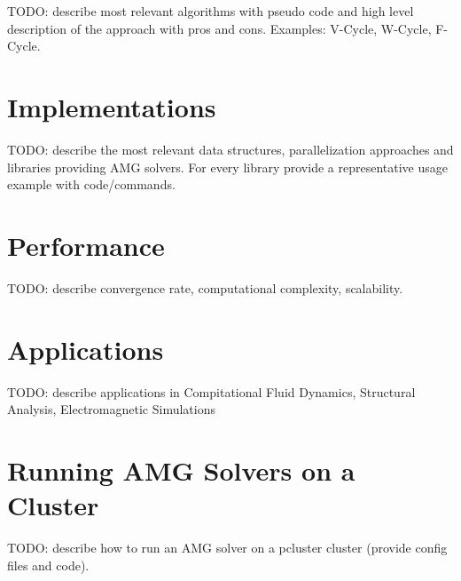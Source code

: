 TODO: describe most relevant algorithms with pseudo code and high level description of the approach with pros and cons. Examples: V-Cycle, W-Cycle, F-Cycle.

\section{Implementations}

TODO: describe the most relevant data structures, parallelization approaches and libraries providing AMG solvers. For every library provide a representative usage example with code/commands.

\section{Performance}

TODO: describe convergence rate, computational complexity, scalability.

\section{Applications}

TODO: describe applications in Compitational Fluid Dynamics, Structural Analysis, Electromagnetic Simulations

\section{Running AMG Solvers on a Cluster}

TODO: describe how to run an AMG solver on a pcluster cluster (provide config files and code).